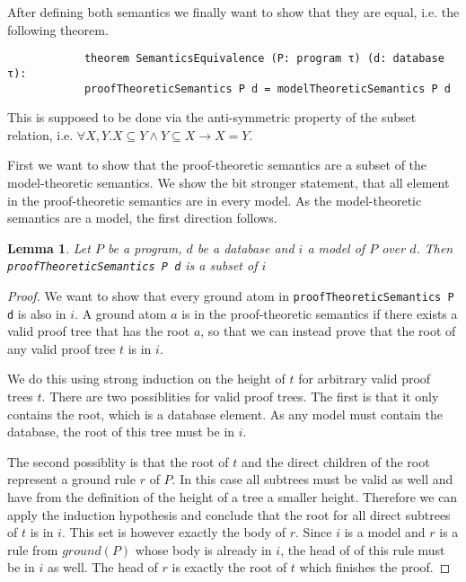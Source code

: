 \documentclass{article}
\newtheorem{lemma}{Lemma}
\begin{document}
        After defining both semantics we finally want to show that they are equal, i.e. the following theorem.

        \begin{lstlisting}
            theorem SemanticsEquivalence (P: program τ) (d: database τ): 
            proofTheoreticSemantics P d = modelTheoreticSemantics P d 
        \end{lstlisting}

        This is supposed to be done via the anti-symmetric property of the subset relation, i.e. $\forall X,Y. X \subseteq Y \land Y \subseteq X \rightarrow X = Y$.

        First we want to show that the proof-theoretic semantics are a subset of the model-theoretic semantics. We show the bit stronger statement, that all element in the proof-theoretic semantics are in every model. As the model-theoretic semantics are a model, the first direction follows.

        \begin{lemma}
            Let $P$ be a program, $d$ be a database and $i$ a model of $P$ over $d$. 
            Then \texttt{proofTheoreticSemantics P d} is a subset of $i$
        \end{lemma}
        \begin{proof}
            We want to show that every ground atom in \texttt{proofTheoreticSemantics P d} is also in $i$. A ground atom $a$ is in the proof-theoretic semantics if there exists a valid proof tree that has the root $a$, so that we can instead prove that the root of any valid proof tree $t$ is in $i$.

            We do this using strong induction on the height of $t$ for arbitrary valid proof trees $t$.
            There are two possiblities for valid proof trees. The first is that it only contains the root, which is a database element. As any model must contain the database, the root of this tree must be in $i$.

            The second possiblity is that the root of $t$ and the direct children of the root represent a ground rule $r$ of $P$. In this case all subtrees must be valid as well and have from the definition of the height of a tree a smaller height. Therefore we can apply the induction hypothesis and conclude that the root for all direct subtrees of $t$ is in $i$. This set is however exactly the body of $r$. Since $i$ is a model and $r$ is a rule from $ground(P)$ whose body is already in $i$, the head of of this rule must be in $i$ as well. The head of $r$ is exactly the root of $t$ which finishes the proof.
        \end{proof}
\end{document}
